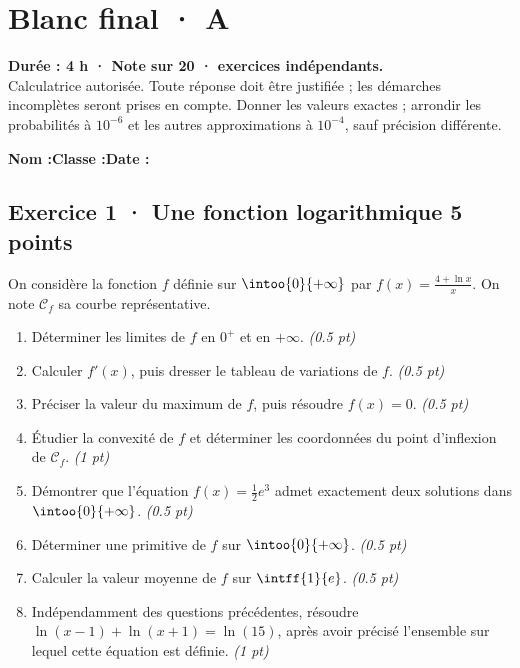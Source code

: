 \fi

\ifmxteacher

\mxnewpage{}\label{sujet:9-3}

\section*{Blanc final · A}


\textbf{Durée : 4 h · Note sur 20 ·  exercices indépendants.}\\Calculatrice autorisée. Toute réponse doit être justifiée ; les démarches incomplètes seront prises en compte. Donner les valeurs exactes ; arrondir les probabilités à $10^{-6}$ et les autres approximations à $10^{-4}$, sauf précision différente.

\smallskip\textbf{Nom :}\enspace\dotfill\quad\textbf{Classe :}\enspace\dotfill\quad\textbf{Date :}\enspace\dotfill

\subsection*{Exercice 1 · Une fonction logarithmique \hfill 5 points}On considère la fonction $f$ définie sur $\intoo{0}{+\infty}$ par $f(x)=\frac{4+\ln x}x$. On note $\mathcal C_f$ sa courbe représentative.

\begin{enumerate}

\item Déterminer les limites de $f$ en $0^+$ et en $+\infty$. \hfill\textit{(\num{0,5} pt)}

\item Calculer $f' (x)$, puis dresser le tableau de variations de $f$. \hfill\textit{(\num{0,5} pt)}

\item Préciser la valeur du maximum de $f$, puis résoudre $f(x)=0$. \hfill\textit{(\num{0,5} pt)}

\item Étudier la convexité de $f$ et déterminer les coordonnées du point d'inflexion de $\mathcal C_f$. \hfill\textit{(1 pt)}

\item Démontrer que l'équation $f(x)=\frac12 e^{3}$ admet exactement deux solutions dans $\intoo{0}{+\infty}$. \hfill\textit{(\num{0,5} pt)}

\item Déterminer une primitive de $f$ sur $\intoo{0}{+\infty}$. \hfill\textit{(\num{0,5} pt)}

\item Calculer la valeur moyenne de $f$ sur $\intff{1}{e}$. \hfill\textit{(\num{0,5} pt)}

\item Indépendamment des questions précédentes, résoudre $\ln(x-1)+\ln(x+1)=\ln(15)$, après avoir précisé l'ensemble sur lequel cette équation est définie. \hfill\textit{(1 pt)}

\end{enumerate}

